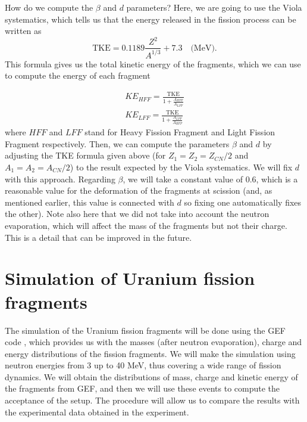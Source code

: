 \documentclass{article}
\begin{document}
How do we compute the $\beta$ and $d$ parameters? Here, we are going to use the Viola systematics, which tells us that the energy released in the fission process can be written as
\begin{equation}
    \text{TKE} = 0.1189 \frac{Z^2}{A^{1/3}} + 7.3 \quad \text{(MeV)}.
\end{equation}
This formula gives us the total kinetic energy of the fragments, which we can use to compute the energy of each fragment

\begin{align}
KE_{HFF}= \frac{\text{TKE}} {1+\frac{A_{HFF}}{A_{LFF}}} \\
KE_{LFF}= \frac{\text{TKE}} {1+\frac{A_{LFF}}{A_{HFF}}}
\end{align}
where $HFF$ and $LFF$ stand for Heavy Fission Fragment and Light Fission Fragment respectively.
Then, we can compute the parameters $\beta$ and $d$ by adjusting the TKE formula given above (for $Z_1=Z_2=Z_{CN}/2$ and $A_1=A_2=A_{CN}/2$) to the result expected by the Viola systematics. We will fix $d$ with this approach. Regarding $\beta$, we will take a constant value of 0.6, which is a reasonable value for the deformation of the fragments at scission (and, as mentioned earlier, this value is connected with $d$ so fixing one automatically fixes the other).
Note also here that we did not take into account the neutron evaporation, which will affect the mass of the fragments but not their charge. This is a detail that can be improved in the future.

\section{Simulation of Uranium fission fragments}
The simulation of the Uranium fission fragments will be done using the GEF code \cite{GEF}, which provides us with the masses (after neutron evaporation), charge and energy distributions of the fission fragments. We will make the simulation using neutron energies from 3 up to 40 MeV, thus covering a wide range of fission dynamics. We will obtain the distributions of mass, charge and kinetic energy of the fragments from GEF, and then we will use these events to compute the acceptance of the setup.
The procedure will allow us to compare the results with the experimental data obtained in the experiment.
\end{document}

